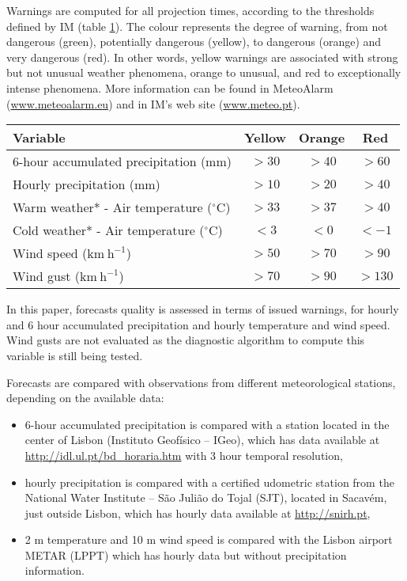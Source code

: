 Warnings are computed for all projection times, according to the thresholds defined by IM (table \ref{tb:thr}). The colour represents the degree of warning, from not dangerous (green), potentially dangerous (yellow), to dangerous (orange) and very dangerous (red). In other words, yellow warnings are associated with strong but not unusual weather phenomena, orange to unusual, and red to exceptionally intense phenomena. More information can be found in MeteoAlarm (\url{www.meteoalarm.eu}) and in IM's web site (\url{www.meteo.pt}). 


\begin{table}[!htp]
    \small
    \centering
    \begin{tabular}{lccc}
    \toprule
    Variable & Yellow & Orange & Red \\
    \midrule
    6-hour accumulated precipitation (mm) & $> 30$ & $> 40$ & $> 60$ \\
    Hourly precipitation (mm) & $> 10$ & $> 20$ & $> 40$ \\           
    Warm weather* - Air temperature ($\mathrm{^{\circ}C}$) & $> 33$ & $> 37$ & $> 40$ \\           
    Cold weather* - Air temperature ($\mathrm{^{\circ}C}$) & $< 3$ & $< 0$ & $< -1$ \\    
    Wind speed ($\mathrm{km\ h^{-1}}$) & $> 50$ & $> 70$ & $> 90$ \\        
    Wind gust ($\mathrm{km\ h^{-1}}$) & $> 70$ & $> 90$ & $> 130$ \\               
    \bottomrule
    \end{tabular}
    \label{tb:thr}
\end{table}

In this paper, forecasts quality is assessed in terms of issued warnings, for hourly and 6 hour accumulated precipitation and hourly temperature and wind speed. Wind gusts are not evaluated as the diagnostic algorithm to compute this variable is still being tested. 

Forecasts are compared with observations from different meteorological stations, depending on the available data: 

\begin{itemize}
    \item 6-hour accumulated precipitation is compared with a station located in the center of Lisbon (Instituto Geofísico – IGeo), which has data available at \url{http://idl.ul.pt/bd_horaria.htm} with 3 hour temporal resolution,
    \item hourly precipitation is compared with a certified udometric station from the National Water Institute  – São Julião do Tojal (SJT), located in Sacavém, just outside Lisbon, which has hourly data available at \url{http://snirh.pt},
    \item 2 m temperature and 10 m wind speed is compared with the Lisbon airport METAR (LPPT) which has hourly data but without precipitation information. 
\end{itemize}

